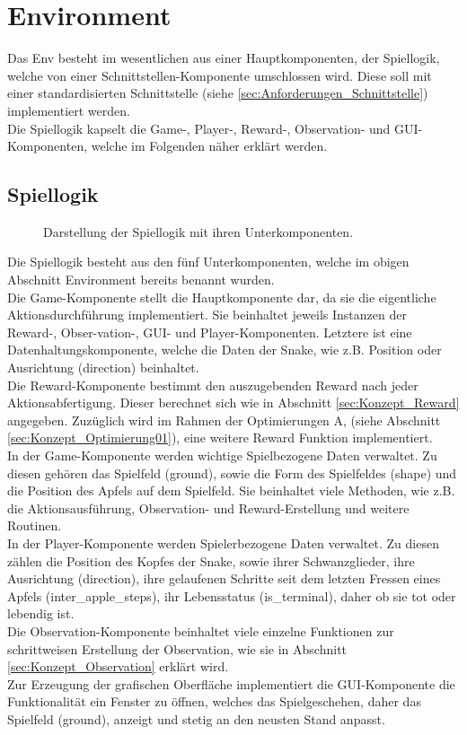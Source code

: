 \section{Environment} \label{sec:Konzept_Environment}
Das Env besteht im wesentlichen aus einer Hauptkomponenten, der Spiellogik, welche von einer Schnittstellen-Komponente umschlossen wird. Diese soll mit einer standardisierten Schnittstelle (siehe \ref{sec:Anforderungen_Schnittstelle}) implementiert werden.\\
Die Spiellogik kapselt die Game-, Player-, Reward-, Observation- und GUI-Komponenten, welche im Folgenden näher erklärt werden.

\subsection{Spiellogik} \label{sec:Konzept_Spiellogik}
\begin{figure}[H]
	\centering
	\def\svgscale{0.17}
	
	\caption[Spiellogik]{Darstellung der Spiellogik mit ihren Unterkomponenten.}
	\label{fig:Spiellogik}
\end{figure}
Die Spiellogik besteht aus den fünf Unterkomponenten, welche im obigen Abschnitt Environment bereits benannt wurden.\\
Die Game-Komponente stellt die Hauptkomponente dar, da sie die eigentliche Aktionsdurchführung implementiert. Sie beinhaltet jeweils Instanzen der Reward-, Obser-vation-, GUI- und Player-Komponenten. Letztere ist eine Datenhaltungskomponente, welche die Daten der Snake, wie z.B. Position oder Ausrichtung (direction) beinhaltet.\\
Die Reward-Komponente bestimmt den auszugebenden Reward nach jeder Aktionsabfertigung. Dieser berechnet sich wie in Abschnitt \ref{sec:Konzept_Reward} angegeben. Zuzüglich wird im Rahmen der Optimierungen A, (siehe Abschnitt \ref{sec:Konzept_Optimierung01}), eine weitere Reward Funktion implementiert.\\
In der Game-Komponente werden wichtige Spielbezogene Daten verwaltet. Zu diesen gehören das Spielfeld (ground), sowie die Form des Spielfeldes (shape) und die Position des Apfels auf dem Spielfeld. Sie beinhaltet viele Methoden, wie z.B. die Aktionsausführung, Observation- und Reward-Erstellung und weitere Routinen.\\
In der Player-Komponente werden Spielerbezogene Daten verwaltet. Zu diesen zählen die Position des Kopfes der Snake, sowie ihrer Schwanzglieder, ihre Ausrichtung (direction), ihre gelaufenen Schritte seit dem letzten Fressen eines Apfels (inter\_apple\_steps), ihr Lebensstatus (is\_terminal), daher ob sie tot oder lebendig ist.\\
Die Observation-Komponente beinhaltet viele einzelne Funktionen zur schrittweisen Erstellung der Observation, wie sie in Abschnitt \ref{sec:Konzept_Observation} erklärt wird.\\
Zur Erzeugung der grafischen Oberfläche implementiert die GUI-Komponente die Funktionalität ein Fenster zu öffnen, welches das Spielgeschehen, daher das Spielfeld (ground), anzeigt und stetig an den neusten Stand anpasst.

